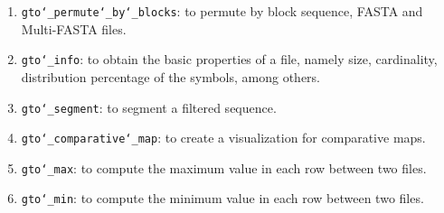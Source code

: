 \begin{enumerate}
\item \texttt{gto\char`_permute\char`_by\char`_blocks}: to permute by block sequence, FASTA and Multi-FASTA files. 

\item \texttt{gto\char`_info}: to obtain the basic properties of a file, namely size, cardinality, distribution percentage of the symbols, among others.

\item \texttt{gto\char`_segment}: to segment a filtered sequence.

\item \texttt{gto\char`_comparative\char`_map}: to create a visualization for comparative maps.

\item \texttt{gto\char`_max}: to compute the maximum value in each row between two files.

\item \texttt{gto\char`_min}: to compute the minimum value in each row between two files.

\end{enumerate}
















